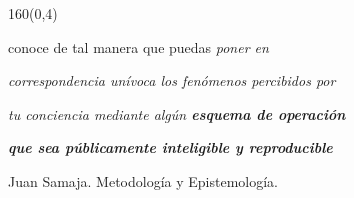 \documentclass[shownotes,aspectratio=169]{beamer}
\newif\ifen
\newif\ifes
\newcommand{\en}[1]{\ifen#1\fi}
\newcommand{\es}[1]{\ifes#1\fi}
\begin{document}
\begin{frame}[plain]
\begin{textblock}{160}(0,4)
 \centering
 \LARGE \textcolor{black!85}{\en{Science as intersubjectivity}}
\end{textblock}
\vspace{0.75cm}

 
\begin{center}
conoce de tal manera que puedas \emph{poner en}

\emph{correspondencia unívoca los fenómenos percibidos por}

\emph{tu conciencia mediante algún \textbf{esquema de operación}}

\emph{\textbf{que sea públicamente inteligible y reproducible}}

\vspace{0.2cm}
{\small \hspace{5cm} Juan Samaja. Metodología y Epistemología.}
\end{center}



\end{frame}
\end{document}
